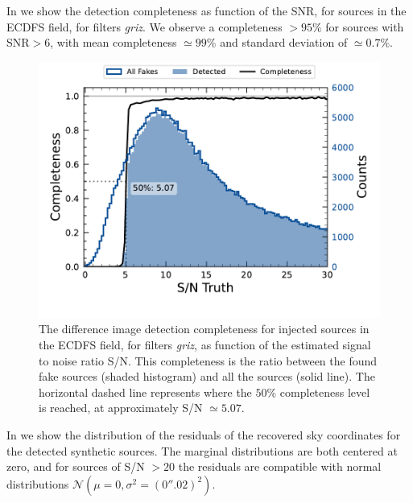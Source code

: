 In  we show the detection completeness as function of the \gls{SNR}, for sources in the \gls{ECDFS} field, for filters \textit{griz}. We observe a completeness $>95\%$ for sources with \gls{SNR}$> 6$, with mean completeness $\simeq 99\%$ and standard deviation of $\simeq 0.7\%$.
%
\begin{figure}[htb!]
\centering
\includegraphics[width=0.98\linewidth]{figures/efficiency_snr_griz.pdf}
\caption{The difference image detection completeness for injected sources in the \gls{ECDFS} field, for filters \textit{griz}, as function of the estimated signal to noise ratio S/N. This completeness is the ratio between the found fake sources (shaded histogram) and all the sources (solid line). The horizontal dashed line represents where the $50\%$ completeness level is reached, at approximately S/N $\simeq 5.07$.}
\label{fig:eff_snr_griz}
\vspace{0.1cm}
\end{figure}
%
In  we show the distribution of the residuals of the recovered sky coordinates for the detected synthetic sources. The marginal distributions are both centered at zero, and for sources of S/N $>20$ the residuals are compatible with normal distributions $\mathcal{N}(\mu=0, \sigma^2=(0''.02)^2)$.
%
